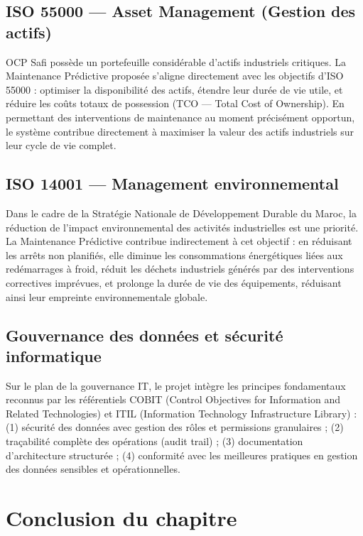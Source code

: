 \documentclass[a4paper,12pt]{report}
\begin{document}
\subsection{ISO 55000 — Asset Management (Gestion des actifs)}

OCP Safi possède un portefeuille considérable d'actifs industriels critiques. La Maintenance Prédictive proposée s'aligne directement avec les objectifs d'ISO 55000 : optimiser la disponibilité des actifs, étendre leur durée de vie utile, et réduire les coûts totaux de possession (TCO — Total Cost of Ownership). En permettant des interventions de maintenance au moment précisément opportun, le système contribue directement à maximiser la valeur des actifs industriels sur leur cycle de vie complet.

\subsection{ISO 14001 — Management environnemental}

Dans le cadre de la Stratégie Nationale de Développement Durable du Maroc, la réduction de l'impact environnemental des activités industrielles est une priorité. La Maintenance Prédictive contribue indirectement à cet objectif : en réduisant les arrêts non planifiés, elle diminue les consommations énergétiques liées aux redémarrages à froid, réduit les déchets industriels générés par des interventions correctives imprévues, et prolonge la durée de vie des équipements, réduisant ainsi leur empreinte environnementale globale.

\subsection{Gouvernance des données et sécurité informatique}

Sur le plan de la gouvernance IT, le projet intègre les principes fondamentaux reconnus par les référentiels COBIT (Control Objectives for Information and Related Technologies) et ITIL (Information Technology Infrastructure Library) : (1) sécurité des données avec gestion des rôles et permissions granulaires ; (2) traçabilité complète des opérations (audit trail) ; (3) documentation d'architecture structurée ; (4) conformité avec les meilleures pratiques en gestion des données sensibles et opérationnelles.

\section*{Conclusion du chapitre}
\end{document}
